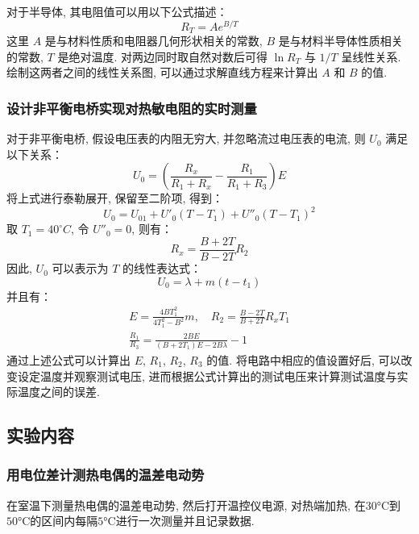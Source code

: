\documentclass[zihao=5, UTF8]{article}
\theoremstyle{MyLineTheoremStyle} %
\theoremstyle{MyBlockTheoremStyle} %
\theoremstyle{MySubsubsectionStyle} %
\begin{document}
对于半导体, 其电阻值可以用以下公式描述：
\begin{equation}
    R_T = A e^{B/T}
\end{equation}
这里 $A$ 是与材料性质和电阻器几何形状相关的常数, $B$ 是与材料半导体性质相关的常数, $T$ 是绝对温度. 对两边同时取自然对数后可得 $\ln R_T$ 与 $1/T$ 呈线性关系. 绘制这两者之间的线性关系图, 可以通过求解直线方程来计算出 $A$ 和 $B$ 的值. 

\subsubsection{设计非平衡电桥实现对热敏电阻的实时测量}
对于非平衡电桥, 假设电压表的内阻无穷大, 并忽略流过电压表的电流, 则 $U_0$ 满足以下关系：
\begin{equation}
    U_0 = \left(\frac{R_x}{R_1 + R_x} - \frac{R_1}{R_1 + R_3}\right) E
\end{equation}
将上式进行泰勒展开, 保留至二阶项, 得到：
\begin{equation}
    U_0 = U_{01} + U'_0 (T - T_1) + U''_0 (T - T_1)^2
\end{equation}
取 $T_1 = 40^\circ C$, 令 $U''_0 = 0$, 则有：
\begin{equation}
    R_x = \frac{B + 2T}{B - 2T} R_2
\end{equation}
因此, $U_0$ 可以表示为 $T$ 的线性表达式：
\begin{equation}
    U_0 = \lambda + m(t - t_1)
\end{equation}
并且有：
\begin{gather}
    E = \frac{4 B T_1^2}{4 T_1^2 - B^2} m, \quad R_2 = \frac{B - 2T}{B + 2T} R_x T_1 \\
    \frac{R_1}{R_3} = \frac{2 B E}{(B + 2 T_1) E - 2 B \lambda} - 1
\end{gather}
通过上述公式可以计算出 $E$, $R_1$, $R_2$, $R_3$ 的值. 将电路中相应的值设置好后, 可以改变设定温度并观察测试电压, 进而根据公式计算出的测试电压来计算测试温度与实际温度之间的误差. 

\subsection{实验内容}

\subsubsection{用电位差计测热电偶的温差电动势}
在室温下测量热电偶的温差电动势, 然后打开温控仪电源, 对热端加热, 在$30\si{\celsius}$到$50\si{\celsius}$的区间内每隔$5\si{\celsius}$进行一次测量并且记录数据. 
\end{document}
